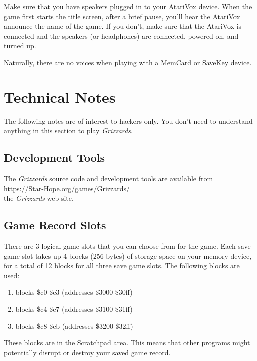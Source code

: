 \documentclass[10pt,twocolumn,openany,article]{memoir}
\begin{document}
\begin{description}
Make sure  that you have  speakers plugged  in to your  AtariVox device.
When the game first starts the title screen, after a brief pause, you'll
hear the AtariVox announce the name of the game. If you don't, make sure
that  the AtariVox  is connected  and the  speakers (or  headphones) are
connected, powered on, and turned up.

Naturally,  there  are  no  voices   when  playing  with  a  MemCard  or
SaveKey device. 

\chapter{Technical Notes}

The following notes are of interest to hackers only. You don't need to
understand anything in this section to play \textit{Grizzards}.

\section{Development Tools}

The \textit{Grizzards}  source code and development  tools are available
from \\
\href{https://Star-Hope.org/games/Grizzards/}{https://Star-Hope.org/games/Grizzards/} \\
the \textit{Grizzards} web site.

\section{Game Record Slots}

There are 3  logical game slots that  you can choose from  for the game.
Each save game  slot takes up 4  blocks (256 bytes) of  storage space on
your memory  device, for a  total of 12 blocks  for all three  save game
slots. The following blocks are used:

\ifdefined\DEMO

\begin{enumerate}
\item blocks \$c0-\$c3 (addresses \$3000-\$30ff)
\item blocks \$c4-\$c7 (addresses \$3100-\$31ff)
\item blocks \$c8-\$cb (addresses \$3200-\$32ff)
\end{enumerate}

These blocks are in the Scratchpad  area. This means that other programs
might potentially disrupt or destroy your saved game record.


\end{description}
\end{document}
